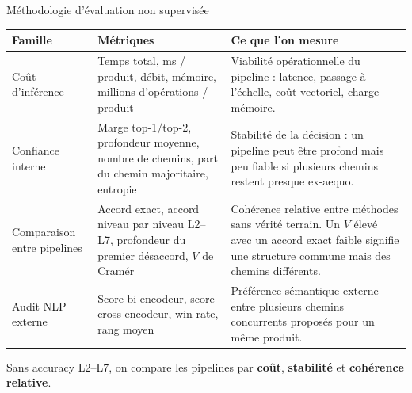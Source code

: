 \documentclass[11pt,aspectratio=169]{beamer}
\begin{document}
\begin{frame}{Méthodologie d'évaluation non supervisée}
\scriptsize
\renewcommand{\arraystretch}{1.18}
\begin{table}
\centering
\begin{tabular}{p{}p{}p{}}
\toprule
\textbf{Famille} & \textbf{Métriques} & \textbf{Ce que l'on mesure} \\
\midrule
Coût d'inférence & Temps total, ms / produit, débit, mémoire, millions d'opérations / produit & Viabilité opérationnelle du pipeline : latence, passage à l'échelle, coût vectoriel, charge mémoire. \\
Confiance interne & Marge top-1/top-2, profondeur moyenne, nombre de chemins, part du chemin majoritaire, entropie & Stabilité de la décision : un pipeline peut être profond mais peu fiable si plusieurs chemins restent presque ex-aequo. \\
Comparaison entre pipelines & Accord exact, accord niveau par niveau L2--L7, profondeur du premier désaccord, $V$ de Cramér & Cohérence relative entre méthodes sans vérité terrain. Un $V$ élevé avec un accord exact faible signifie une structure commune mais des chemins différents. \\
Audit NLP externe & Score bi-encodeur, score cross-encodeur, win rate, rang moyen & Préférence sémantique externe entre plusieurs chemins concurrents proposés pour un même produit. \\
\bottomrule
\end{tabular}
\end{table}

\vspace{0.2cm}

\begin{takeawaybox}
\centering
Sans accuracy L2--L7, on compare les pipelines par \textbf{coût}, \textbf{stabilité} et \textbf{cohérence relative}.
\end{takeawaybox}
\end{frame}
\end{document}
